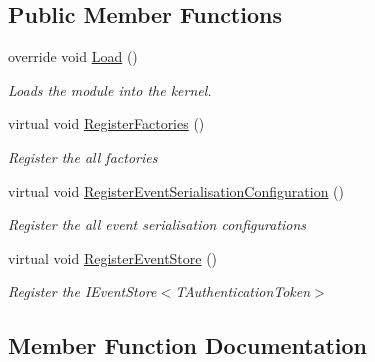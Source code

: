 \subsection*{Public Member Functions}
\begin{DoxyCompactItemize}
\item 
override void \hyperlink{classCqrs_1_1Ninject_1_1Azure_1_1BlobStorage_1_1Configuration_1_1TableStoragEventStoreModule_a00d516abc48623861401c6820091537a_a00d516abc48623861401c6820091537a}{Load} ()
\begin{DoxyCompactList}\small\item\em Loads the module into the kernel. \end{DoxyCompactList}\item 
virtual void \hyperlink{classCqrs_1_1Ninject_1_1Azure_1_1BlobStorage_1_1Configuration_1_1TableStoragEventStoreModule_a5e2b0f48414eb9863a8457766a2c585b_a5e2b0f48414eb9863a8457766a2c585b}{Register\+Factories} ()
\begin{DoxyCompactList}\small\item\em Register the all factories \end{DoxyCompactList}\item 
virtual void \hyperlink{classCqrs_1_1Ninject_1_1Azure_1_1BlobStorage_1_1Configuration_1_1TableStoragEventStoreModule_a01e4cd605fe9df419f99732e6fde48ac_a01e4cd605fe9df419f99732e6fde48ac}{Register\+Event\+Serialisation\+Configuration} ()
\begin{DoxyCompactList}\small\item\em Register the all event serialisation configurations \end{DoxyCompactList}\item 
virtual void \hyperlink{classCqrs_1_1Ninject_1_1Azure_1_1BlobStorage_1_1Configuration_1_1TableStoragEventStoreModule_adc8463786567202b9af8af7cf8f40f07_adc8463786567202b9af8af7cf8f40f07}{Register\+Event\+Store} ()
\begin{DoxyCompactList}\small\item\em Register the I\+Event\+Store$<$\+T\+Authentication\+Token$>$ \end{DoxyCompactList}\end{DoxyCompactItemize}


\subsection{Member Function Documentation}
\mbox{\label{classCqrs_1_1Ninject_1_1Azure_1_1BlobStorage_1_1Configuration_1_1TableStoragEventStoreModule_a00d516abc48623861401c6820091537a_a00d516abc48623861401c6820091537a}} 
